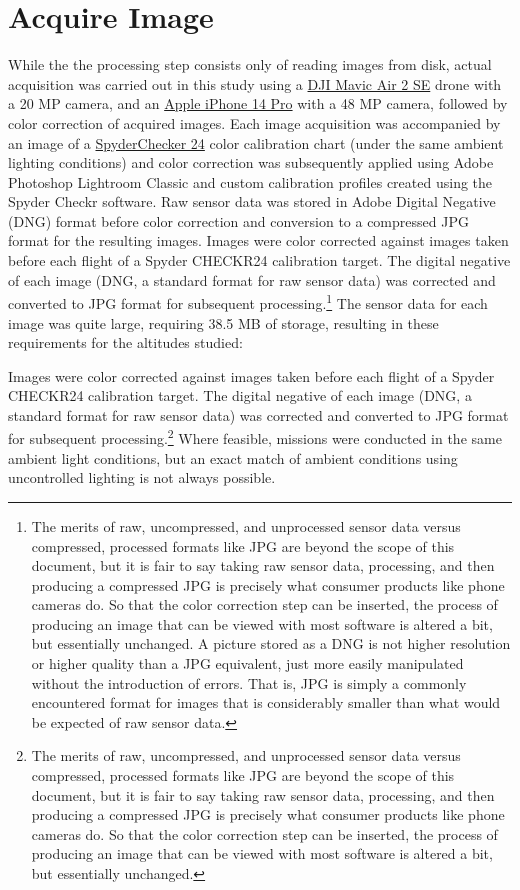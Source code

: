 \documentclass[letterpaper]{article}
\begin{document}
\section{Acquire Image}
While the the processing step consists only of reading images from disk, actual acquisition was carried out in this study using a \href{https://www.dji.com/air-2s/specs} {DJI Mavic Air 2 SE} drone with a 20 MP camera, and an \href{https://support.apple.com/en-us/111849} {Apple iPhone 14 Pro} with a 48 MP camera, followed by color correction of acquired images. Each image acquisition was accompanied by an image of a \href{https://www.datacolor.com/spyder/products/spyder-checkr-photo/} {SpyderChecker 24} color calibration chart (under the same ambient lighting conditions) and color correction was subsequently applied using Adobe Photoshop Lightroom Classic and custom calibration profiles created using the Spyder Checkr software. Raw sensor data was stored in Adobe Digital Negative (DNG) format before color correction and conversion to a compressed JPG format for the resulting images. Images were color corrected against images taken before each flight of a Spyder CHECKR24 calibration target. The digital negative of each image (DNG, a standard format for raw sensor data) was corrected and converted to JPG format for subsequent processing.\footnote{The merits of raw, uncompressed, and unprocessed sensor data versus compressed, processed formats like JPG are beyond the scope of this document, but it is fair to say taking raw sensor data, processing, and then producing a compressed JPG is precisely what consumer products like phone cameras do. So that the color correction step can be inserted, the process of producing an image that can be viewed with most software is altered a bit, but essentially unchanged. A picture stored as a DNG is not higher resolution or higher quality than a JPG equivalent, just more easily manipulated without the introduction of errors. That is, JPG is simply a commonly encountered format for images that is considerably smaller than what would be expected of raw sensor data.} The sensor data for each image was quite large, requiring 38.5 MB of storage, resulting in these requirements for the altitudes studied:

Images were color corrected against images taken before each flight of a Spyder CHECKR24 calibration target. The digital negative of each image (DNG, a standard format for raw sensor data) was corrected and converted to JPG format for subsequent processing.\footnote{The merits of raw, uncompressed, and unprocessed sensor data versus compressed, processed formats like JPG are beyond the scope of this document, but it is fair to say taking raw sensor data, processing, and then producing a compressed JPG is precisely what consumer products like phone cameras do. So that the color correction step can be inserted, the process of producing an image that can be viewed with most software is altered a bit, but essentially unchanged.}
Where feasible, missions were conducted in the same ambient light conditions, but an exact match of ambient conditions using uncontrolled lighting is not always possible.
\end{document}
